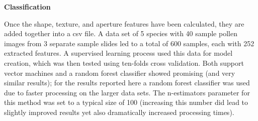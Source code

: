 \textbf{Classification}

Once the shape, texture, and aperture features have been calculated, they are added together into a csv file. A data set of 5 species with 40 sample pollen images from 3 separate sample slides led to a total of 600 samples, each with 252 extracted features. A supervised learning process used this data for model creation, which was then tested using ten-folds cross validation. Both support vector machines and a random forest classifier showed promising (and very similar results); for the results reported here a random forest classifier was used due to faster processing on the larger data sets. The n-estimators parameter for this method was set to a typical size of 100 (increasing this number did lead to slightly improved results yet also dramatically increased processing times).
    
  
  